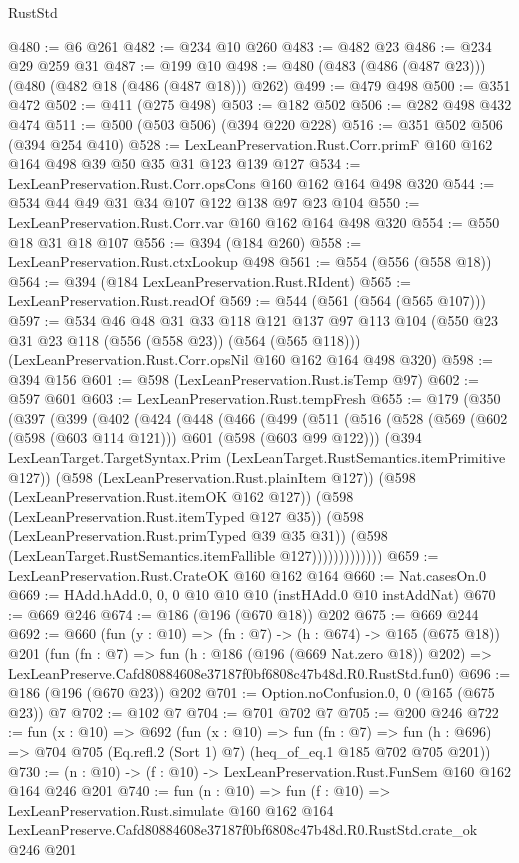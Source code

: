 \begin{lexlean}{RustStd}
\begin{coremodule}
@480 := @6 @261
@482 := @234 @10 @260
@483 := @482 @23
@486 := @234 @29 @259 @31
@487 := @199 @10
@498 := @480 (@483 (@486 (@487 @23))) (@480 (@482 @18 (@486 (@487 @18))) @262)
@499 := @479 @498
@500 := @351 @472
@502 := @411 (@275 @498)
@503 := @182 @502
@506 := @282 @498 @432 @474
@511 := @500 (@503 @506) (@394 @220 @228)
@516 := @351 @502 @506 (@394 @254 @410)
@528 := LexLeanPreservation.Rust.Corr.primF @160 @162 @164 @498 @39 @50 @35 @31 @123 @139 @127
@534 := LexLeanPreservation.Rust.Corr.opsCons @160 @162 @164 @498 @320
@544 := @534 @44 @49 @31 @34 @107 @122 @138 @97 @23 @104
@550 := LexLeanPreservation.Rust.Corr.var @160 @162 @164 @498 @320
@554 := @550 @18 @31 @18 @107
@556 := @394 (@184 @260)
@558 := LexLeanPreservation.Rust.ctxLookup @498
@561 := @554 (@556 (@558 @18))
@564 := @394 (@184 LexLeanPreservation.Rust.RIdent)
@565 := LexLeanPreservation.Rust.readOf
@569 := @544 (@561 (@564 (@565 @107)))
@597 := @534
    @46
    @48
    @31
    @33
    @118
    @121
    @137
    @97
    @113
    @104
    (@550 @23 @31 @23 @118 (@556 (@558 @23)) (@564 (@565 @118)))
    (LexLeanPreservation.Rust.Corr.opsNil @160 @162 @164 @498 @320)
@598 := @394 @156
@601 := @598 (LexLeanPreservation.Rust.isTemp @97)
@602 := @597 @601
@603 := LexLeanPreservation.Rust.tempFresh
@655 := @179
    (@350
      (@397
        (@399
          (@402
            (@424
              (@448
                (@466
                  (@499
                    (@511
                      (@516
                        (@528
                          (@569 (@602 (@598 (@603 @114 @121))) @601 (@598 (@603 @99 @122)))
                          (@394
                            LexLeanTarget.TargetSyntax.Prim
                            (LexLeanTarget.RustSemantics.itemPrimitive @127))
                          (@598 (LexLeanPreservation.Rust.plainItem @127))
                          (@598 (LexLeanPreservation.Rust.itemOK @162 @127))
                          (@598 (LexLeanPreservation.Rust.itemTyped @127 @35))
                          (@598 (LexLeanPreservation.Rust.primTyped @39 @35 @31))
                          (@598 (LexLeanTarget.RustSemantics.itemFallible @127)))))))))))))
@659 := LexLeanPreservation.Rust.CrateOK @160 @162 @164
@660 := Nat.casesOn.{0}
@669 := HAdd.hAdd.{0, 0, 0} @10 @10 @10 (instHAdd.{0} @10 instAddNat)
@670 := @669 @246
@674 := @186 (@196 (@670 @18)) @202
@675 := @669 @244
@692 := @660
    (fun (y : @10) => (fn : @7) -> (h : @674) -> @165 (@675 @18))
    @201
    (fun (fn : @7) =>
    fun (h : @186 (@196 (@669 Nat.zero @18)) @202) =>
    LexLeanPreserve.Cafd80884608e37187f0bf6808c47b48d.R0.RustStd.fun0)
@696 := @186 (@196 (@670 @23)) @202
@701 := Option.noConfusion.{0, 0} (@165 (@675 @23)) @7
@702 := @102 @7
@704 := @701 @702 @7
@705 := @200 @246
@722 := fun (x : @10) =>
  @692
    (fun (x : @10) =>
    fun (fn : @7) =>
    fun (h : @696) => @704 @705 (Eq.refl.{2} (Sort 1) @7) (heq_of_eq.{1} @185 @702 @705 @201))
@730 := (n : @10) -> (f : @10) -> LexLeanPreservation.Rust.FunSem @160 @162 @164 @246 @201
@740 := fun (n : @10) =>
  fun (f : @10) =>
  LexLeanPreservation.Rust.simulate
    @160
    @162
    @164
    LexLeanPreserve.Cafd80884608e37187f0bf6808c47b48d.R0.RustStd.crate_ok
    @246
    @201
\end{coremodule}
\end{lexlean}
